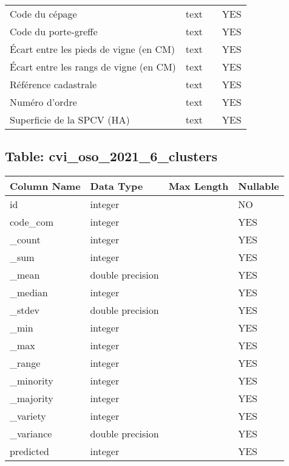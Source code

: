 \begin{tabular}{llrl}
 Code du cépage                         & text              &              & YES        \\
 Code du porte-greffe                   & text              &              & YES        \\
 Écart entre les pieds de vigne (en CM) & text              &              & YES        \\
 Écart entre les rangs de vigne (en CM) & text              &              & YES        \\
 Référence cadastrale                   & text              &              & YES        \\
 Numéro d'ordre                         & text              &              & YES        \\
 Superficie de la SPCV (HA)             & text              &              & YES        \\
\hline
\end{tabular}
\subsection*{Table: cvi_oso_2021_6_clusters}
\begin{tabular}{llll}
\hline
 Column Name   & Data Type        & Max Length   & Nullable   \\
\hline
 id            & integer          &              & NO         \\
 code_com      & integer          &              & YES        \\
 _count        & integer          &              & YES        \\
 _sum          & integer          &              & YES        \\
 _mean         & double precision &              & YES        \\
 _median       & integer          &              & YES        \\
 _stdev        & double precision &              & YES        \\
 _min          & integer          &              & YES        \\
 _max          & integer          &              & YES        \\
 _range        & integer          &              & YES        \\
 _minority     & integer          &              & YES        \\
 _majority     & integer          &              & YES        \\
 _variety      & integer          &              & YES        \\
 _variance     & double precision &              & YES        \\
 predicted     & integer          &              & YES        \\
\hline
\end{tabular}
